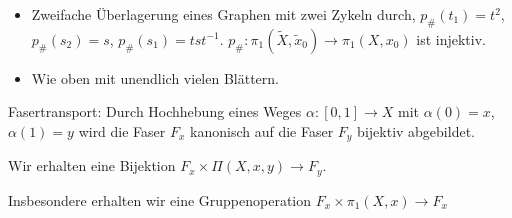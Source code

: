 \begin{ex}
    \begin{itemize}
        \item
            Zweifache Überlagerung eines Graphen mit zwei Zykeln durch, $p_\#(t_1) = t^2$, $p_\#(s_2) = s$, $p_\#(s_1) = tst^{-1}$.
            $p_\#: \pi_1(\tilde X, \tilde x_0) \to \pi_1(X, x_0)$ ist injektiv.
        \item
            Wie oben mit unendlich vielen Blättern.
    \end{itemize}
\end{ex}

\begin{df}
    Fasertransport:
    Durch Hochhebung eines Weges $\alpha: [0,1] \to X$ mit $\alpha(0) = x$, $\alpha(1) = y$ wird die Faser $F_x$ kanonisch auf die Faser $F_y$ bijektiv abgebildet.

    Wir erhalten eine Bijektion $F_x \times \Pi(X,x,y) \to F_y$.

    Insbesondere erhalten wir eine Gruppenoperation $F_x \times \pi_1(X, x) \to F_x$
\end{df}

